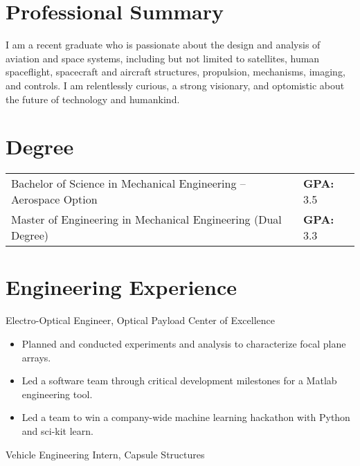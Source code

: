\documentclass{resume}
\begin{document}

\section{Professional Summary}
I am a recent graduate who is passionate about the design and analysis of
aviation and space systems, including but not limited to satellites, human
spaceflight, spacecraft and aircraft structures, propulsion, mechanisms,
imaging, and controls. I am relentlessly curious, a strong visionary, and
optomistic about the future of technology and humankind.

\section{Degree}
\begin{tabular}{ll}
Bachelor of Science in Mechanical Engineering -- Aerospace Option & {\bf GPA: } 3.5 \\
Master of Engineering in Mechanical Engineering (Dual Degree) & {\bf GPA: } 3.3 \\
\end{tabular}

\section{Engineering Experience}
Electro-Optical Engineer, Optical Payload Center of Excellence
\begin{itemize}
  \item Planned and conducted experiments and analysis to characterize focal plane arrays.
  \item Led a software team through critical development milestones for a Matlab engineering tool. 
  \item Led a team to win a company-wide machine learning hackathon with Python and sci-kit learn.
\end{itemize} 
Vehicle Engineering Intern, Capsule Structures
\end{document}
